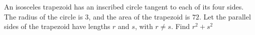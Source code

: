 An isosceles trapezoid has an inscribed circle tangent to each of its four sides. The radius of the circle is $3$, and the area of the trapezoid is $72$. Let the parallel sides of the trapezoid have lengths $r$ and $s$, with $r \neq s$. Find $r^2+s^2$